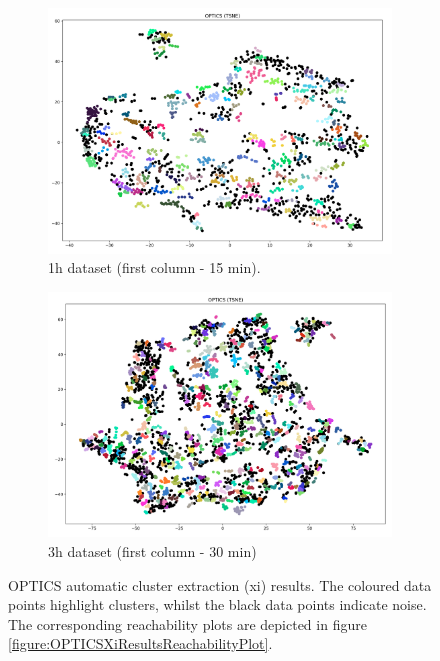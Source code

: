 \begin{figure}[H]
  \centering
  \begin{subfigure}{.5\textwidth}\captionsetup{width=.8\linewidth}
    \centering
    \includegraphics[width=1\textwidth]{./images/OPTICS/1h-1-OPTICS-xi.png}
  \caption{1h dataset (first column - 15 min).}
  \end{subfigure}%
  \hfill
  \begin{subfigure}{.5\textwidth}\captionsetup{width=.8\linewidth}
    \centering
    \includegraphics[width=1\textwidth]{./images/OPTICS/3h-1-OPTICS-xi.png}
    \caption{3h dataset (first column - 30 min)}
  \end{subfigure}
  \caption{OPTICS automatic cluster extraction (xi) results. The coloured data points highlight clusters, whilst the black data points indicate noise. The corresponding reachability plots are depicted in figure \ref{figure:OPTICSXiResultsReachabilityPlot}.}
  \label{figure:OPTICSXiResults}
  \end{figure}

